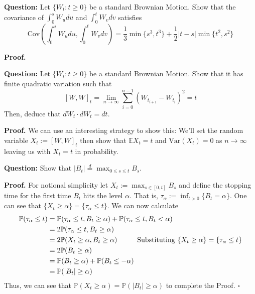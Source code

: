 \documentclass{article}
\begin{document}
\begin{tcolorbox}[colframe=black,colback=gray!5,boxrule=0.5pt]
\textbf{Question:} Let $\{W_t : t\geq0 \}$ be a standard Brownian Motion. Show that the covariance of $\int_0^s W_udu$ and $\int_0^t W_vdv$ satisfies
$$\text{Cov}\left(\int_0^s W_udu, \int_0^t W_vdv\right) = \frac{1}{3}\min\{s^3, t^3\} + \frac{1}{2}|t-s|\min\{t^2, s^2\}$$
\end{tcolorbox}
\textbf{Proof.}

\begin{tcolorbox}[colframe=black,colback=gray!5,boxrule=0.5pt]
\textbf{Question:} Let $\{W_t : t\geq0 \}$ be a standard Brownian Motion. Show that it has finite quadratic variation such that 
$$[W,W]_t = \lim_{n\to\infty}\sum_{i=0}^{n-1}(W_{t_{i+1}} - W_{t_i})^2 = t$$
Then, deduce that $dW_t\cdot dW_t = dt.$
\end{tcolorbox}
\textbf{Proof.} We can use an interesting strategy to show this: We'll set the random variable $X_t := [W,W]_t$ then show that $\mathbb{E}X_t = t$ and $\text{Var}(X_t)=0$ as $n\to\infty$ leaving us with $X_t=t$ in probability.



\begin{tcolorbox}[colframe=black,colback=gray!5,boxrule=0.5pt]
\textbf{Question:} Show that $|B_t| \stackrel{d}{=} \max_{0\leq s\leq t} B_s$.
\end{tcolorbox}
\textbf{Proof.} For notional simplicity let $X_t := \max_{s\in[0,t]} B_s$ and define the stopping time for the first time $B_t$ hits the level $\alpha$. That is, $\tau_\alpha := \inf_{t>0}\{B_t = \alpha\}$. One can see that $\{X_t\geq\alpha\} = \{\tau_\alpha \leq t\}$. We can now calculate
\begin{align*}
    \mathbb{P}(\tau_\alpha \leq t) &= \mathbb{P}(\tau_\alpha\leq t, B_t \geq \alpha) + \mathbb{P}(\tau_\alpha\leq t, B_t < \alpha) \\
    &= 2\mathbb{P}(\tau_\alpha\leq t, B_t \geq \alpha) \\
    &= 2\mathbb{P}(X_t\geq \alpha, B_t\geq \alpha) \hspace{10mm}\text{{Substituting $\{X_t\geq\alpha\} = \{\tau_\alpha \leq t\}$}} \\
    &= 2\mathbb{P}(B_t\geq \alpha) \\
    &= \mathbb{P}(B_t\geq \alpha) + \mathbb{P}(B_t\leq -\alpha) \\
    &=\mathbb{P}(|B_t|\geq\alpha)
\end{align*}
Thus, we can see that $\mathbb{P}(X_t\geq\alpha) = \mathbb{P}(|B_t|\geq\alpha)$ to complete the Proof. $\square$
\end{document}
